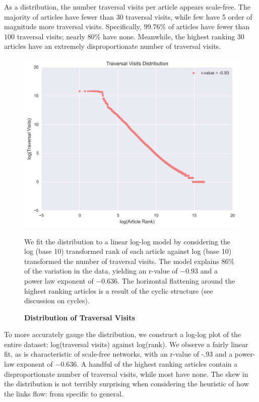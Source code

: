 \documentclass[pre,twocolumn,twoside,superscriptaddress,floatfix, aps, 10pt]{revtex4-1}
\begin{document}
As a distribution, the number traversal visits per article appears scale-free. The majority of articles have fewer than 30 traversal visits, while few 
have 5 order of magnitude more traversal visits. 
Specifically, $99.76\%$ of articles have fewer than $100$ traversal visits; nearly $80\%$ have none. 
Meanwhile, the highest ranking 30 articles have an extremely disproportionate number of traversal visits.

\begin{figure}[tp!]
  \centering	
  \includegraphics[width=\columnwidth]{graphics/traversals_per_article.png} 
  \caption{
    \textbf{Distribution of Traversal Visits}
  }
  We fit the distribution to a linear log-log model by considering the log (base 10) transformed rank of each article against log (base 10) transformed the number of traversal visits. 
  The model explains $86\%$ of the variation in the data, yielding an r-value of $-0.93$ 
  and a power law exponent of $-0.636$. The horizontal flattening around the highest
  ranking articles is a result of the cyclic structure (see discussion on cycles).
  \label{fig:Distribution of Visits}

\end{figure}

To more accurately gauge the distribution, we construct a log-log plot of the entire dataset: log(traversal visits) against log(rank). We observe a fairly linear fit, as is characteristic of scale-free networks, with an r-value of -.93 and 
a power-law exponent of $-0.636$. A handful of the highest ranking articles contain a disproportionate number of traversal visits, while most have none. The skew in the distribution is not terribly surprising when considering the heuristic of how the links flow: from specific to general. 
\end{document}
